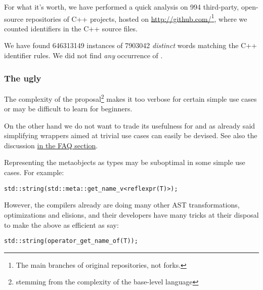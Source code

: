 For what it's worth, we have performed a quick analysis on \num{994} third-party,
open-source repositories of C++ projects, hosted on
\url{http://github.com/}\footnote{The main branches of original repositories,
not forks.}, where we counted identifiers in the C++ source files.

We have found \num{646313149} instances of \num{7903042} {\em distinct} words
matching the C++ identifier rules.  We did not find {\em any} occurrence of
.

\subsubsection{The ugly}

The complexity of the proposal\footnote{stemming from the complexity of the
base-level language} makes it too verbose for certain simple use cases
or may be difficult to learn for beginners.

On the other hand we do not want to trade its usefulness for 
and as already said simplifying wrappers aimed at trivial use cases can easily
be devised. See also the discussion \hyperref[faq-hard-on-novices]{in the FAQ
section}.

Representing the metaobjects as types may be suboptimal in some simple
use cases. For example:

\begin{verbatim}
std::string(std::meta::get_name_v<reflexpr(T)>);
\end{verbatim}

However, the compilers already are doing many other AST transformations,
optimizations and elisions, and their developers have many tricks at their
disposal to make the above as efficient as say:

\begin{verbatim}
std::string(operator_get_name_of(T));
\end{verbatim}

